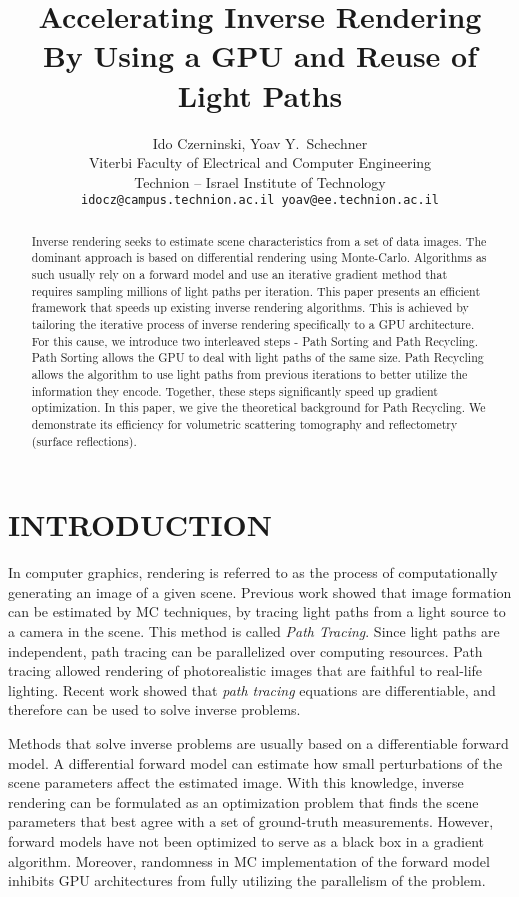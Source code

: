 \documentclass{article}
\title{Accelerating Inverse Rendering\\ By Using a GPU and Reuse of Light Paths}
\author{ 
Ido Czerninski, Yoav Y.~Schechner \\
	Viterbi Faculty of Electrical and Computer Engineering\\
	Technion – Israel Institute of Technology\\
	\texttt{idocz@campus.technion.ac.il  yoav@ee.technion.ac.il} \\
}
\begin{document}
\maketitle

\begin{abstract}
Inverse rendering seeks to estimate scene characteristics from a set of data images. The dominant approach is based on differential rendering using Monte-Carlo. Algorithms as such usually rely on a forward model and use an iterative gradient method that requires sampling millions of light paths per iteration. This paper presents an efficient framework that speeds up existing inverse rendering algorithms. This is achieved by tailoring the iterative process of inverse rendering specifically to a \ac{GPU} architecture. For this cause, we introduce two interleaved steps - Path Sorting and Path Recycling. Path Sorting allows the \ac{GPU} to deal with light paths of the same size. Path Recycling allows the algorithm to use light paths from previous iterations to better utilize the information they encode. Together, these steps significantly speed up  gradient optimization. In this paper, we give the theoretical background for Path Recycling. We demonstrate its efficiency for volumetric scattering tomography and reflectometry (surface reflections).
\end{abstract}




\section{INTRODUCTION}
\label{sec:intro}
In computer graphics, rendering is referred to as the process of computationally generating an image of a given scene. Previous work \citep{kajiya1986rendering} showed that image formation can be estimated by \ac{MC} techniques, by tracing light paths from a light source to a camera in the scene. This method is called {\em Path Tracing}. Since light paths are independent, path tracing can be parallelized over computing resources. Path tracing allowed rendering of photorealistic images that are faithful to real-life lighting. Recent work showed that {\em path tracing} equations are differentiable, and therefore can be used to solve inverse problems. 

Methods that solve inverse problems are usually based on a differentiable forward model. A differential forward model can estimate how small perturbations of the scene parameters affect the estimated image. With this knowledge, inverse rendering can be formulated as an optimization problem that finds the scene parameters that best agree with a set of ground-truth measurements. However, forward models have not been optimized to serve as a black box in a gradient algorithm. Moreover, randomness in \ac{MC} implementation of the forward model inhibits \ac{GPU} architectures from fully utilizing the parallelism of the problem.  
\end{document}
